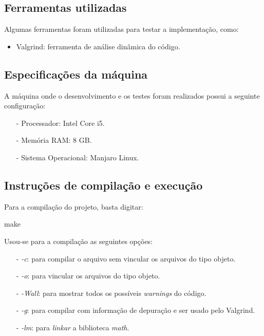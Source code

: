 \documentclass{article}
\begin{document}

\subsection{Ferramentas utilizadas}

\hspace*{\parindent}Algumas ferramentas foram utilizadas para testar a implementação, como:

\begin{itemize}
  \item Valgrind: ferramenta de análise dinâmica do código.
\end{itemize}


\subsection{Especificações da máquina}

\hspace*{\parindent}A máquina onde o desenvolvimento e os testes foram realizados possui a seguinte configuração:

\begin{itemize}
    \item[-] Processador: Intel Core i5.
    \item[-] Memória RAM: 8 GB.
    \item[-] Sistema Operacional: Manjaro Linux.
\end{itemize}


\subsection{Instruções de compilação e execução}

\hspace*{\parindent}Para a compilação do projeto, basta digitar:\\

\begin{tcolorbox}[title=Compilando o projeto,width=\linewidth]
    
    make

\end{tcolorbox}

Usou-se para a compilação as seguintes opções:

\begin{itemize}
    \item [-] \emph{-c}: para compilar o arquivo sem vincular os arquivos do tipo objeto.
    \item [-] \emph{-o}: para vincular os arquivos do tipo objeto.
    \item [-] \emph{-Wall}: para mostrar todos os possíveis \textit{warnings} do código.
    \item [-] \emph{-g}: para compilar com informação de depuração e ser usado pelo Valgrind.
    \item [-] \emph{-lm}: para \textit{linkar} a biblioteca \textit{math}.\\
\end{itemize}
\end{document}
